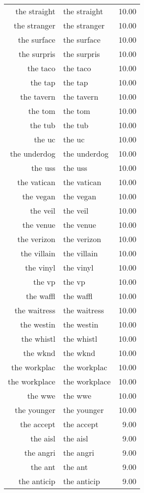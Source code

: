 \begin{table}[ht]
\begin{tabular}{rlr}
  the straight & the straight & 10.00 \\ 
  the stranger & the stranger & 10.00 \\ 
  the surface & the surface & 10.00 \\ 
  the surpris & the surpris & 10.00 \\ 
  the taco & the taco & 10.00 \\ 
  the tap & the tap & 10.00 \\ 
  the tavern & the tavern & 10.00 \\ 
  the tom & the tom & 10.00 \\ 
  the tub & the tub & 10.00 \\ 
  the uc & the uc & 10.00 \\ 
  the underdog & the underdog & 10.00 \\ 
  the uss & the uss & 10.00 \\ 
  the vatican & the vatican & 10.00 \\ 
  the vegan & the vegan & 10.00 \\ 
  the veil & the veil & 10.00 \\ 
  the venue & the venue & 10.00 \\ 
  the verizon & the verizon & 10.00 \\ 
  the villain & the villain & 10.00 \\ 
  the vinyl & the vinyl & 10.00 \\ 
  the vp & the vp & 10.00 \\ 
  the waffl & the waffl & 10.00 \\ 
  the waitress & the waitress & 10.00 \\ 
  the westin & the westin & 10.00 \\ 
  the whistl & the whistl & 10.00 \\ 
  the wknd & the wknd & 10.00 \\ 
  the workplac & the workplac & 10.00 \\ 
  the workplace & the workplace & 10.00 \\ 
  the wwe & the wwe & 10.00 \\ 
  the younger & the younger & 10.00 \\ 
  the accept & the accept & 9.00 \\ 
  the aisl & the aisl & 9.00 \\ 
  the angri & the angri & 9.00 \\ 
  the ant & the ant & 9.00 \\ 
  the anticip & the anticip & 9.00 \\ 

\end{tabular}
\end{table}
